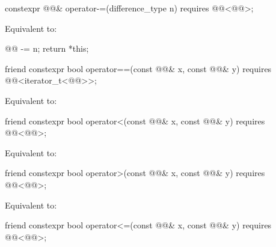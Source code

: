 %
\begin{itemdecl}
constexpr @@& operator-=(difference_type n)
  requires @@<@@>;
\end{itemdecl}

\begin{itemdescr}
\pnum
\effects
Equivalent to:
\begin{codeblock}
@@ -= n;
return *this;
\end{codeblock}
\end{itemdescr}

%
\begin{itemdecl}
friend constexpr bool operator==(const @@& x, const @@& y)
  requires @@<iterator_t<@@>>;
\end{itemdecl}

\begin{itemdescr}
\pnum
\effects
Equivalent to: 
\end{itemdescr}

%
\begin{itemdecl}
friend constexpr bool operator<(const @@& x, const @@& y)
  requires @@<@@>;
\end{itemdecl}

\begin{itemdescr}
\pnum
\effects
Equivalent to: 
\end{itemdescr}

%
\begin{itemdecl}
friend constexpr bool operator>(const @@& x, const @@& y)
  requires @@<@@>;
\end{itemdecl}

\begin{itemdescr}
\pnum
\effects
Equivalent to: 
\end{itemdescr}

%
\begin{itemdecl}
friend constexpr bool operator<=(const @@& x, const @@& y)
  requires @@<@@>;
\end{itemdecl}

